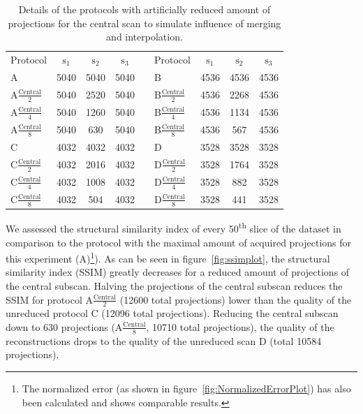 \begin{table}
	\centering
	\caption{Details of the protocols with artificially reduced amount of projections for the central scan to simulate influence of merging and interpolation.}
	\begin{tabular}{lcccclccc}
		Protocol & $\textrm{s}_{1}$ & $\textrm{s}_{2}$ & $\textrm{s}_{3}$ &  &  Protocol & $\textrm{s}_{1}$ & $\textrm{s}_{2}$ & $\textrm{s}_{3}$ \\
		A & 5040 & 5040 & 5040 &  &  B & 4536 & 4536 & 4536 \\
		A$\frac{\textrm{Central}}{2}$ & 5040 & 2520 & 5040 &  & B$\frac{\textrm{Central}}{2}$ & 4536 & 2268 & 4536 \\
		A$\frac{\textrm{Central}}{4}$ & 5040 & 1260 & 5040 &  & B$\frac{\textrm{Central}}{4}$ & 4536 & 1134 & 4536 \\
		A$\frac{\textrm{Central}}{8}$ & 5040 & 630 & 5040 &  & B$\frac{\textrm{Central}}{8}$ & 4536 & 567 & 4536 \\
		\hline
		C & 4032 & 4032 & 4032 &  &  D & 3528 & 3528 & 3528 \\
		C$\frac{\textrm{Central}}{2}$ & 4032 & 2016 & 4032 &  & D$\frac{\textrm{Central}}{2}$ & 3528 & 1764 & 3528 \\
		C$\frac{\textrm{Central}}{4}$ & 4032 & 1008 & 4032 &  & D$\frac{\textrm{Central}}{4}$ & 3528 & 882 & 3528 \\
		C$\frac{\textrm{Central}}{8}$ & 4032 & 504 & 4032 &  & D$\frac{\textrm{Central}}{8}$ & 3528 & 441 & 3528 \\
	\end{tabular}  
	\label{tab:abcd}
\end{table}

We assessed the structural similarity index \cite{Wang2004} of every 50\textsuperscript{th} slice of the dataset in comparison to the protocol with the maximal amount of acquired projections for this experiment (A)\footnote{The normalized error (as shown in figure~\ref{fig:NormalizedErrorPlot}) has also been calculated and shows comparable results.}). As can be seen in figure~\ref{fig:ssimplot}, the structural similarity index (SSIM) greatly decreases for a reduced amount of projections of the central subscan. Halving the projections of the central subscan reduces the SSIM for protocol A$\frac{\textrm{Central}}{2}$ (12600 total projections) lower than the quality of the unreduced protocol C (12096 total projections). Reducing the central subscan down to 630 projections (A$\frac{\textrm{Central}}{8}$, 10710 total projections), the quality of the reconstructions drops to the quality of the unreduced scan D (total 10584 projections). 

